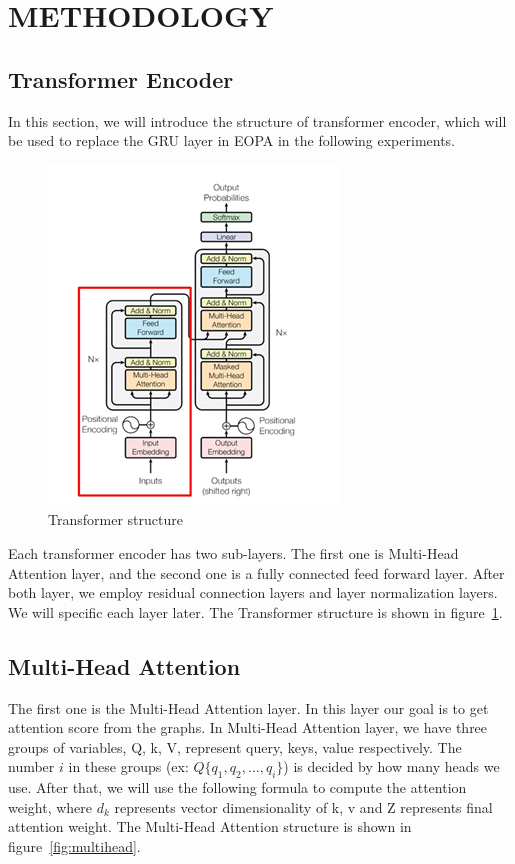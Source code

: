 \documentclass{article}
\begin{document}

\section{METHODOLOGY}

\subsection{Transformer Encoder}

In this section, we will introduce the structure of transformer encoder,
which will be used to replace the GRU layer in EOPA
in the following experiments.

\begin{figure}
    \centering
    \includegraphics[scale=0.8]{tf}
    \caption{Transformer structure}
    \label{fig:tf}
\end{figure}

Each transformer encoder has two sub-layers.
The first one is Multi-Head Attention layer,
and the second one is a fully connected feed forward layer.
After both layer, we employ residual connection layers and
layer normalization layers. We will specific each layer later.
The Transformer structure is shown in figure~\ref{fig:tf}.

\subsection{Multi-Head Attention}

The first one is the Multi-Head Attention layer.
In this layer our goal is to get attention score from the graphs.
In Multi-Head Attention layer, we have three groups of variables,
Q, k, V, represent query, keys, value respectively.
The number $i$ in these groups (ex: $Q\{q_1, q_2, \dots, q_i\}$)
is decided by how many heads we use. After that,
we will use the following formula to compute the attention weight,
where $d_k$ represents vector dimensionality of k, v and
Z represents final attention weight.
The Multi-Head Attention structure is shown in figure~\ref{fig:multihead}.
\end{document}
